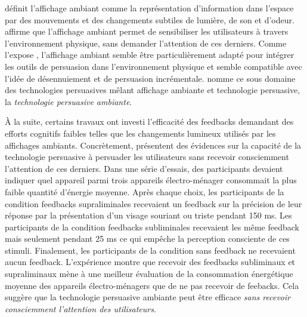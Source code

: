 \documentclass[10pt,a5paper,twoside]{article}
\begin{document}
\citet{ishii1997tangible} définit l'affichage ambiant comme la
représentation d'information dans l'espace par des mouvements et des
changements subtiles de lumière, de son et d'odeur.
\citet{wisneski1998ambient} affirme que l'affichage ambiant permet de
sensibiliser les utilisateurs à travers l'environnement physique, sans
demander l'attention de ces derniers. Comme l'expose
\citet{davis2008towards}, l'affichage ambiant semble être
particulièrement adapté pour intégrer les outils de persuasion dans
l'environnement physique et semble compatible avec l'idée de
désennuiement et de persuasion incrémentale. \citet{davis2008towards}
nomme ce sous domaine des technologies persuasives mêlant affichage
ambiante et technologie persuasive, la \emph{technologie persuasive
ambiante}.

À la suite, certains travaux ont investi l'efficacité des feedbacks
demandant des efforts cognitifs faibles telles que les changements
lumineux utilisés par les affichages ambiants. Concrètement,
\citet{ham2009can} présentent des évidences sur la capacité de la
technologie persuasive à persuader les utilisateurs sans recevoir
consciemment l'attention de ces derniers. Dans une série d'essais, des
participants devaient indiquer quel appareil parmi trois appareils
électro-ménager consommait la plus faible quantité d'énergie moyenne.
Après chaque choix, les participants de la condition feedbacks
supraliminales recevaient un feedback sur la précision de leur réponse
par la présentation d'un visage souriant ou triste pendant 150 ms. Les
participants de la condition feedbacks subliminales recevaient les même
feedback mais seulement pendant 25 ms ce qui empêche la perception
consciente de ces stimuli. Finalement, les participants de la condition
sans feedback ne recevaient aucun feedback. L'expérience montre que
recevoir des feedbacks subliminaux et supraliminaux mène à une meilleur
évaluation de la consommation énergétique moyenne des appareils
électro-ménagers que de ne pas recevoir de feebacks. Cela suggère que la
technologie persuasive ambiante peut être efficace \emph{sans recevoir
consciemment l'attention des utilisateurs}.
\end{document}
